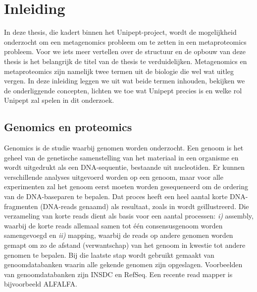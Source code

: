 \chapter{Inleiding} 

\label{chap:inleiding} In deze thesis, die kadert binnen het Unipept-project,
wordt de mogelijkheid onderzocht om een metagenomics probleem om te zetten in
een metaproteomics probleem. Voor we iets meer vertellen over de structuur en de
opbouw van deze thesis is het belangrijk de titel van de thesis te
verduidelijken. Metagenomics en metaproteomics zijn namelijk twee termen uit de
biologie die wel wat uitleg vergen. In deze inleiding leggen we uit wat beide
termen inhouden, bekijken we de onderliggende concepten, lichten we toe wat
Unipept precies is en welke rol Unipept zal spelen in dit onderzoek.

\section{Genomics en proteomics}

Genomics is de studie waarbij genomen worden onderzocht. Een genoom is het
geheel van de genetische samenstelling van het materiaal in een organisme en
wordt uitgedrukt als een DNA-sequentie, bestaande uit nucleotiden. Er kunnen
verschillende analyses uitgevoerd worden op een genoom, maar voor alle
experimenten zal het genoom eerst moeten worden gesequeneerd om de ordering van
de DNA-baseparen te bepalen. Dat proces heeft een heel aantal korte
DNA-fragmenten (DNA-reads genaamd) als resultaat, zoals in 
wordt geïllustreerd. Die verzameling van korte reads dient als basis voor een
aantal processen: \textit{i)} assembly, waarbij de korte reads allemaal samen
tot één consensusgenoom worden samengevoegd en \textit{ii)} mapping, waarbij de
reads op andere genomen worden gemapt om zo de afstand (verwantschap) van het
genoom in kwestie tot andere genomen te bepalen. Bij die laatste stap wordt
gebruikt gemaakt van genoomdatabanken waarin alle gekende genomen zijn
opgeslagen. Voorbeelden van genoomdatabanken zijn INSDC en RefSeq. Een recente
read mapper is bijvoorbeeld ALFALFA\cite{vyverman2015long}.

